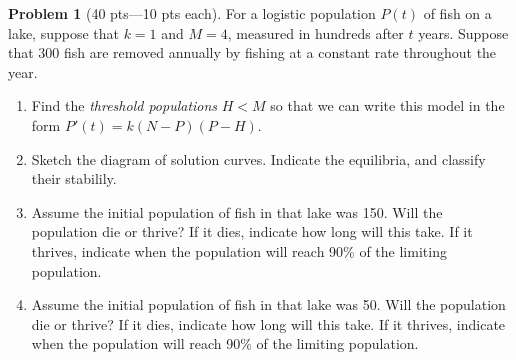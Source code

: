 \documentclass[12pt]{article}
\theoremstyle{definition}
\newtheorem{problem}{Problem}
\begin{document}
\bigskip
\begin{problem}[40 pts---10 pts each]
For a logistic population $P(t)$ of fish on a lake, suppose that $k=1$ and $M=4$, measured in hundreds after $t$ years.  Suppose that 300 fish are removed annually by fishing at a constant rate throughout the year.  
\begin{enumerate}
\item Find the \emph{threshold populations} $H < M$ so that we can write this model in the form \newline $P'(t) = k(N-P)(P-H)$.  
\vspace{1.54cm}
\begin{flushright}
\end{flushright}
\item Sketch the diagram of solution curves.  Indicate the equilibria, and classify their stabilily.
\vspace{3.75cm}
\item Assume the initial population of fish in that lake was 150.  Will the population die or thrive?  If it dies, indicate how long will this take.  If it thrives, indicate when the population will reach 90\% of the limiting population.
\vspace{3.1cm}
\begin{flushright}
\end{flushright}
\item Assume the initial population of fish in that lake was 50.  Will the population die or thrive?  If it dies, indicate how long will this take.  If it thrives, indicate when the population will reach 90\% of the limiting population.
\vspace{2.1cm}
\begin{flushright}
\end{flushright}
\end{enumerate}
\end{problem}
\end{document}

